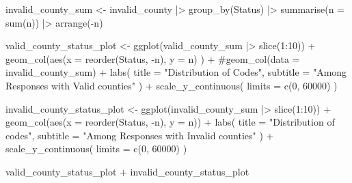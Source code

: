 \documentclass[
  letterpaper,
  DIV=11,
  numbers=noendperiod]{scrartcl}
\newenvironment{Shaded}{\begin{snugshade}}{\end{snugshade}}
\newcommand{\AttributeTok}[1]{\textcolor[rgb]{0.40,0.45,0.13}{#1}}
\newcommand{\CommentTok}[1]{\textcolor[rgb]{0.37,0.37,0.37}{#1}}
\newcommand{\DecValTok}[1]{\textcolor[rgb]{0.68,0.00,0.00}{#1}}
\newcommand{\FunctionTok}[1]{\textcolor[rgb]{0.28,0.35,0.67}{#1}}
\newcommand{\NormalTok}[1]{\textcolor[rgb]{0.00,0.23,0.31}{#1}}
\newcommand{\OtherTok}[1]{\textcolor[rgb]{0.00,0.23,0.31}{#1}}
\newcommand{\SpecialCharTok}[1]{\textcolor[rgb]{0.37,0.37,0.37}{#1}}
\newcommand{\StringTok}[1]{\textcolor[rgb]{0.13,0.47,0.30}{#1}}
\begin{document}
\begin{Shaded}
\begin{Highlighting}[]
\NormalTok{invalid\_county\_sum }\OtherTok{\textless{}{-}}\NormalTok{ invalid\_county }\SpecialCharTok{|\textgreater{}}
  \FunctionTok{group\_by}\NormalTok{(Status) }\SpecialCharTok{|\textgreater{}}
  \FunctionTok{summarise}\NormalTok{(}\AttributeTok{n =} \FunctionTok{sum}\NormalTok{(n)) }\SpecialCharTok{|\textgreater{}}
  \FunctionTok{arrange}\NormalTok{(}\SpecialCharTok{{-}}\NormalTok{n)}

\NormalTok{valid\_county\_status\_plot }\OtherTok{\textless{}{-}} \FunctionTok{ggplot}\NormalTok{(valid\_county\_sum }\SpecialCharTok{|\textgreater{}} \FunctionTok{slice}\NormalTok{(}\DecValTok{1}\SpecialCharTok{:}\DecValTok{10}\NormalTok{)) }\SpecialCharTok{+}
  \FunctionTok{geom\_col}\NormalTok{(}\FunctionTok{aes}\NormalTok{(}\AttributeTok{x =} \FunctionTok{reorder}\NormalTok{(Status, }\SpecialCharTok{{-}}\NormalTok{n), }\AttributeTok{y =}\NormalTok{ n) ) }\SpecialCharTok{+}
  \CommentTok{\#geom\_col(data = invalid\_county\_sum) +}
  \FunctionTok{labs}\NormalTok{(}
    \AttributeTok{title =} \StringTok{"Distribution of Codes"}\NormalTok{,}
    \AttributeTok{subtitle =} \StringTok{"Among Responses with Valid counties"}
\NormalTok{  ) }\SpecialCharTok{+}
  \FunctionTok{scale\_y\_continuous}\NormalTok{( }\AttributeTok{limits =} \FunctionTok{c}\NormalTok{(}\DecValTok{0}\NormalTok{, }\DecValTok{60000}\NormalTok{) )}

\NormalTok{invalid\_county\_status\_plot }\OtherTok{\textless{}{-}} \FunctionTok{ggplot}\NormalTok{(invalid\_county\_sum }\SpecialCharTok{|\textgreater{}} \FunctionTok{slice}\NormalTok{(}\DecValTok{1}\SpecialCharTok{:}\DecValTok{10}\NormalTok{)) }\SpecialCharTok{+}
  \FunctionTok{geom\_col}\NormalTok{(}\FunctionTok{aes}\NormalTok{(}\AttributeTok{x =} \FunctionTok{reorder}\NormalTok{(Status, }\SpecialCharTok{{-}}\NormalTok{n), }\AttributeTok{y =}\NormalTok{ n)) }\SpecialCharTok{+}
  \FunctionTok{labs}\NormalTok{(}
    \AttributeTok{title =} \StringTok{"Distribution of codes"}\NormalTok{,}
    \AttributeTok{subtitle =} \StringTok{"Among Responses with Invalid counties"}
\NormalTok{  ) }\SpecialCharTok{+}
  \FunctionTok{scale\_y\_continuous}\NormalTok{( }\AttributeTok{limits =} \FunctionTok{c}\NormalTok{(}\DecValTok{0}\NormalTok{, }\DecValTok{60000}\NormalTok{) )}

\NormalTok{valid\_county\_status\_plot }\SpecialCharTok{+}\NormalTok{ invalid\_county\_status\_plot}
\end{Highlighting}
\end{Shaded}
\end{document}
